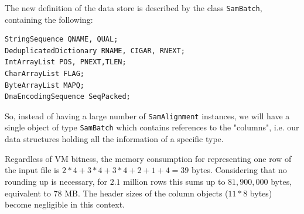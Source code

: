 \documentclass[a4paper,twoside]{article}
\begin{document}
The new definition of the data store is described by the class {\texttt{SamBatch}}, containing the following:
\begin{small}
\begin{verbatim}
StringSequence QNAME, QUAL;
DeduplicatedDictionary RNAME, CIGAR, RNEXT;
IntArrayList POS, PNEXT,TLEN;
CharArrayList FLAG;
ByteArrayList MAPQ;
DnaEncodingSequence SeqPacked;
\end{verbatim}
\end{small}

So, instead of having a large number of {\texttt{SamAlignment}} instances, we will have a single object of type {\texttt{SamBatch}} which contains references to the "columns", i.e. our data structures holding all the information of a specific type.


Regardless of VM bitness, the memory consumption for representing one row of the input file is 
$2*4 + 3*4 + 3*4 + 2 + 1+ 4=39$ bytes.
Considering that no rounding up is necessary, for $2.1$ million rows this sums up to $81,900,000$ bytes, equivalent to $78$ MB. The header sizes of the column objects ($11*8$ bytes) become negligible in this context.


%
\end{document}
